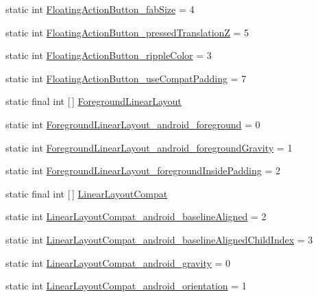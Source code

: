 \begin{DoxyCompactItemize}
static int \hyperlink{classandroid_1_1support_1_1v4_1_1R_1_1styleable_aa59e0b00cd1893f6504e167cb1003ffd}{Floating\+Action\+Button\+\_\+fab\+Size} = 4
\item 
static int \hyperlink{classandroid_1_1support_1_1v4_1_1R_1_1styleable_a22d2414a00735c70b4e4b59e72e0fc1e}{Floating\+Action\+Button\+\_\+pressed\+TranslationZ} = 5
\item 
static int \hyperlink{classandroid_1_1support_1_1v4_1_1R_1_1styleable_a13b7ea4854d33e1c561b1ec784145364}{Floating\+Action\+Button\+\_\+ripple\+Color} = 3
\item 
static int \hyperlink{classandroid_1_1support_1_1v4_1_1R_1_1styleable_ac4a76f5791185c567f07299a6c3327e0}{Floating\+Action\+Button\+\_\+use\+Compat\+Padding} = 7
\item 
static final int \mbox{[}$\,$\mbox{]} \hyperlink{classandroid_1_1support_1_1v4_1_1R_1_1styleable_aa17438061ec7746b98c639b096be8466}{Foreground\+Linear\+Layout}
\item 
static int \hyperlink{classandroid_1_1support_1_1v4_1_1R_1_1styleable_ab7909de85d8b7161fc9132afdb9f0807}{Foreground\+Linear\+Layout\+\_\+android\+\_\+foreground} = 0
\item 
static int \hyperlink{classandroid_1_1support_1_1v4_1_1R_1_1styleable_adfb8b15836c97c4558927711664009e7}{Foreground\+Linear\+Layout\+\_\+android\+\_\+foreground\+Gravity} = 1
\item 
static int \hyperlink{classandroid_1_1support_1_1v4_1_1R_1_1styleable_afc40e43edb351c309af23e1c6b1d91c9}{Foreground\+Linear\+Layout\+\_\+foreground\+Inside\+Padding} = 2
\item 
static final int \mbox{[}$\,$\mbox{]} \hyperlink{classandroid_1_1support_1_1v4_1_1R_1_1styleable_a5410acb05d349e2b35bd2dbadc93b229}{Linear\+Layout\+Compat}
\item 
static int \hyperlink{classandroid_1_1support_1_1v4_1_1R_1_1styleable_ad642c125826d2bed7ae25860cafd6edd}{Linear\+Layout\+Compat\+\_\+android\+\_\+baseline\+Aligned} = 2
\item 
static int \hyperlink{classandroid_1_1support_1_1v4_1_1R_1_1styleable_a2c50eb551dc4f5ea5db0ac221a8ca0d7}{Linear\+Layout\+Compat\+\_\+android\+\_\+baseline\+Aligned\+Child\+Index} = 3
\item 
static int \hyperlink{classandroid_1_1support_1_1v4_1_1R_1_1styleable_aa1757dce9a8d990b61214a54ba88e2fc}{Linear\+Layout\+Compat\+\_\+android\+\_\+gravity} = 0
\item 
static int \hyperlink{classandroid_1_1support_1_1v4_1_1R_1_1styleable_a5b67b845c7e37a891973d4715fc0baeb}{Linear\+Layout\+Compat\+\_\+android\+\_\+orientation} = 1

\end{DoxyCompactItemize}
